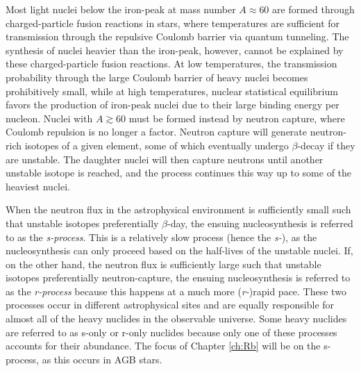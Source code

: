 

Most light nuclei below the iron-peak at mass number $A \approx 60$ are formed through charged-particle fusion reactions in stars, where temperatures are sufficient for transmission through the repulsive Coulomb barrier via quantum tunneling. The synthesis of nuclei heavier than the iron-peak, however, cannot be explained by these charged-particle fusion reactions. At low temperatures, the transmission probability through the large Coulomb barrier of heavy nuclei becomes prohibitively small, while at high temperatures, nuclear statistical equilibrium favors the production of iron-peak nuclei due to their large binding energy per nucleon. Nuclei with $A \gtrsim 60$ must be formed instead by neutron capture, where Coulomb repulsion is no longer a factor. Neutron capture will generate neutron-rich isotopes of a given element, some of which eventually undergo $\beta$-decay if they are unstable. The daughter nuclei will then capture neutrons until another unstable isotope is reached, and the process continues this way up to some of the heaviest nuclei.


When the neutron flux in the astrophysical environment is sufficiently small such that unstable isotopes preferentially $\beta$-day, the ensuing nucleosynthesis is referred to as the \emph{s-process}. This is a relatively slow process (hence the \emph{s-}), as the nucleosynthesis can only proceed based on the half-lives of the unstable nuclei. If, on the other hand, the neutron flux is sufficiently large such that unstable isotopes preferentially neutron-capture, the ensuing nucleosynthesis is referred to as the \emph{r-process} because this happens at a much more (\emph{r-})rapid pace. These two processes occur in different astrophysical sites and are equally responsible for almost all of the heavy nuclides in the observable universe. Some heavy nuclides are referred to as s-only or r-only nuclides because only one of these processes accounts for their abundance. The focus of Chapter \ref{ch:Rb} will be on the s-process, as this occurs in AGB stars.

